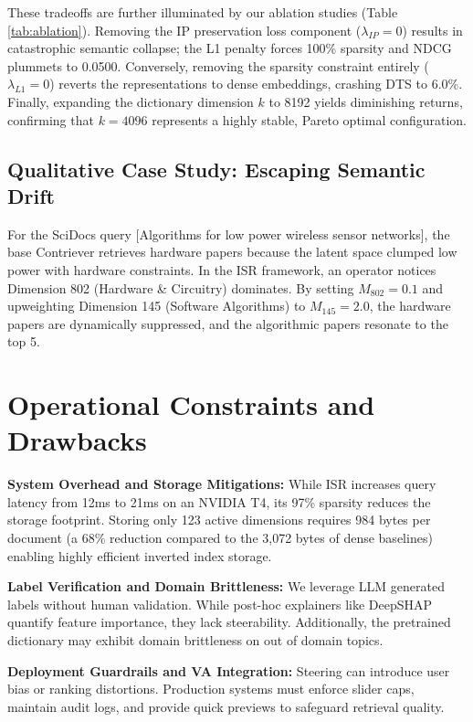 \documentclass[sigconf,anonymous,screen]{acmart}
\begin{document}
These tradeoffs are further illuminated by our ablation studies (Table \ref{tab:ablation}). Removing the IP preservation loss component ($\lambda_{IP}=0$) results in catastrophic semantic collapse; the L1 penalty forces 100\% sparsity and NDCG plummets to 0.0500. Conversely, removing the sparsity constraint entirely ($\lambda_{L1}=0$) reverts the representations to dense embeddings, crashing DTS to 6.0\%. Finally, expanding the dictionary dimension $k$ to 8192 yields diminishing returns, confirming that $k=4096$ represents a highly stable, Pareto optimal configuration.



\subsection{Qualitative Case Study: Escaping Semantic Drift}
\vspace{-2pt}
For the SciDocs query [Algorithms for low power wireless sensor networks], the base Contriever retrieves hardware papers because the latent space clumped low power with hardware constraints. In the ISR framework, an operator notices Dimension 802 (Hardware \& Circuitry) dominates. By setting $M_{802}=0.1$ and upweighting Dimension 145 (Software Algorithms) to $M_{145}=2.0$, the hardware papers are dynamically suppressed, and the algorithmic papers resonate to the top 5.

\section{Operational Constraints and Drawbacks}
\vspace{-2pt}
\textbf{System Overhead and Storage Mitigations:} While ISR increases query latency from 12ms to 21ms on an NVIDIA T4, its 97\% sparsity reduces the storage footprint. Storing only 123 active dimensions requires 984 bytes per document (a 68\% reduction compared to the 3,072 bytes of dense baselines) enabling highly efficient inverted index storage.

\textbf{Label Verification and Domain Brittleness:} We leverage LLM generated labels without human validation. While post-hoc explainers like DeepSHAP \cite{fernando2019study} quantify feature importance, they lack steerability. Additionally, the pretrained dictionary may exhibit domain brittleness on out of domain topics.

\textbf{Deployment Guardrails and VA Integration:} Steering can introduce user bias or ranking distortions. Production systems must enforce slider caps, maintain audit logs, and provide quick previews to safeguard retrieval quality.
\end{document}
